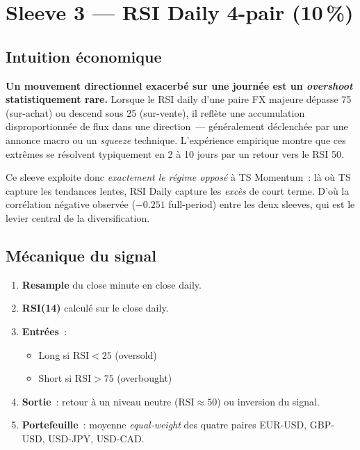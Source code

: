 \section{Sleeve 3 --- RSI Daily 4-pair (10\,\%)}
\label{sec:rsi_daily}

\subsection{Intuition économique}

\begin{thesisbox}
\textbf{Un mouvement directionnel exacerbé sur une journée est un \emph{overshoot} statistiquement rare.} Lorsque le RSI daily d'une paire FX majeure dépasse 75 (sur-achat) ou descend sous 25 (sur-vente), il reflète une accumulation disproportionnée de flux dans une direction~--- généralement déclenchée par une annonce macro ou un \emph{squeeze} technique. L'expérience empirique montre que ces extrêmes se résolvent typiquement en 2 à 10 jours par un retour vers le RSI 50.
\end{thesisbox}

Ce sleeve exploite donc \emph{exactement le régime opposé} à TS Momentum~: là où TS capture les tendances lentes, RSI Daily capture les \emph{excès} de court terme. D'où la corrélation négative observée ($-0.251$ full-period) entre les deux sleeves, qui est le levier central de la diversification.

\subsection{Mécanique du signal}

\begin{enumerate}
\item \textbf{Resample} du close minute en close daily.
\item \textbf{RSI(14)} calculé sur le close daily.
\item \textbf{Entrées}~:
  \begin{itemize}
  \item Long si $\mathrm{RSI} < 25$ (oversold)
  \item Short si $\mathrm{RSI} > 75$ (overbought)
  \end{itemize}
\item \textbf{Sortie}~: retour à un niveau neutre ($\mathrm{RSI} \approx 50$) ou inversion du signal.
\item \textbf{Portefeuille}~: moyenne \emph{equal-weight} des quatre paires EUR-USD, GBP-USD, USD-JPY, USD-CAD.
\end{enumerate}

